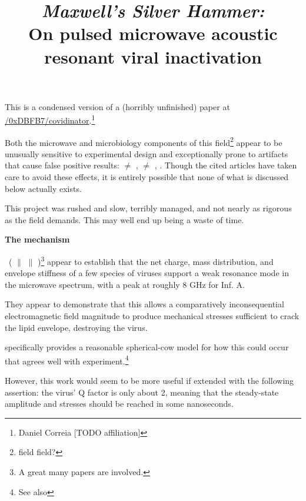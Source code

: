 \documentclass[fleqn,10pt]{paper}
\title{{\it Maxwell's Silver Hammer:}\\ On pulsed microwave acoustic resonant viral inactivation}
\begin{document}
\maketitle


This is a condensed version of a (horribly unfinished) paper at \href{https://www.github.com/0xDBFB7/covidinator/documents/paper.pdf}{\faGithub/0xDBFB7/covidinator}.\footnote{Daniel Correia [TODO affiliation] }



Both the microwave and microbiology components of this field\footnote{field field?} appear to be unusually sensitive to experimental design and exceptionally prone to artifacts that cause false positive results: \cite{Microwave1982} $\neq$ \cite{Resonances1987}, \cite{Effects1985a} $\neq$ \cite{Cytogenetic1986}, \cite{Comprehensive2018}. Though the cited articles have taken care to avoid these effects, it is entirely possible that none of what is discussed below actually exists.  

This project was rushed and slow, terribly managed, and not nearly as rigorous as the field demands. This may well end up being a waste of time.


{\Large \textbf{The mechanism}}


\cite{Microwave2009} \textrightarrow \ (\cite{focusing2014} $\parallel$ \cite{Efficient2015} $\parallel$ \cite{Resonant2017})\footnote{A great many papers are involved.} appear to establish that the net charge, mass distribution, and envelope stiffness of a few species of viruses support a weak resonance mode in the microwave spectrum, with a peak at roughly 8 GHz for Inf. A.

They appear to demonstrate that this allows a comparatively inconsequential electromagnetic field magnitude to produce mechanical stresses sufficient to crack the lipid envelope, destroying the virus.

\cite{Efficient2015} specifically provides a reasonable spherical-cow model for how this could occur that agrees well with experiment.\footnote{See also }

However, this work would seem to be more useful if extended with the following assertion: the virus' Q factor is only about 2, meaning that the steady-state amplitude and stresses should be reached in some nanoseconds.
\end{document}

